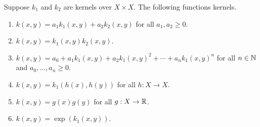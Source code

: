 \begin{theorem}
    \cite{rudin2020notes,shawe2004kernel}
    Suppose \(k_1\) and \(k_2\) are kernels over \(X \times X\).
    The following functions kernels.
    \begin{enumerate}
        \item \(k(x,y) = a_1 k_1(x,y) + a_2 k_2(x,y)\) for all \(a_1, a_2 \geq 0\).
        \item \(k(x,y) = k_1(x,y) k_2(x,y)\).
        \item \(k(x,y) = a_0 + a_1 k_1(x,y) + a_2 k_1(x,y)^2 + \cdots + a_n k_1(x,y)^n\) for all \(n \in \mathbb{N}\) and \(a_0, \dots, a_n \geq 0\).
        \item \(k(x,y) = k_1(h(x),h(y))\) for all \(h : X \to X\).
        \item \(k(x,y) = g(x)g(y)\) for all \(g : X \to \mathbb{R}\).
        \item \(k(x,y) = \exp(k_1(x,y))\).
    \end{enumerate}
\end{theorem}

